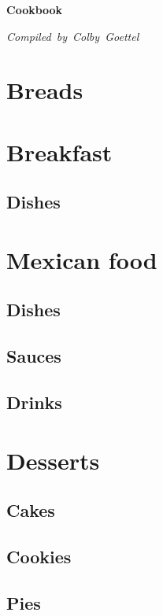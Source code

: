 \documentclass{article}
\begin{document}
\begin{titlepage}
    \begin{center}
        \vspace{10pt}
        {\huge \bfseries Cookbook}\\[0.4cm]

        \vfill
        
        \begin{flushright}
            \large{\emph{Compiled~by~Colby~Goettel}}
        \end{flushright}
    \end{center}
\end{titlepage}

\tableofcontents\clearpage

\section{Breads}


\section{Breakfast}
\subsection{Dishes}


\section{Mexican food}
\subsection{Dishes}

\subsection{Sauces}

\subsection{Drinks}



\section{Desserts}
\subsection{Cakes}

\subsection{Cookies}

\subsection{Pies}

\end{document}
